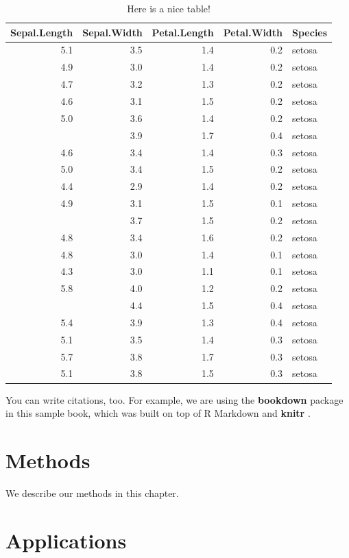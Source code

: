 \documentclass[]{book}
\begin{document}
\begin{table}[t]

\caption{\label{tab:nice-tab}Here is a nice table!}
\centering
\begin{tabular}{rrrrl}
\toprule
Sepal.Length & Sepal.Width & Petal.Length & Petal.Width & Species\\
\midrule
5.1 & 3.5 & 1.4 & 0.2 & setosa\\
4.9 & 3.0 & 1.4 & 0.2 & setosa\\
4.7 & 3.2 & 1.3 & 0.2 & setosa\\
4.6 & 3.1 & 1.5 & 0.2 & setosa\\
5.0 & 3.6 & 1.4 & 0.2 & setosa\\
\addlinespace
5.4 & 3.9 & 1.7 & 0.4 & setosa\\
4.6 & 3.4 & 1.4 & 0.3 & setosa\\
5.0 & 3.4 & 1.5 & 0.2 & setosa\\
4.4 & 2.9 & 1.4 & 0.2 & setosa\\
4.9 & 3.1 & 1.5 & 0.1 & setosa\\
\addlinespace
5.4 & 3.7 & 1.5 & 0.2 & setosa\\
4.8 & 3.4 & 1.6 & 0.2 & setosa\\
4.8 & 3.0 & 1.4 & 0.1 & setosa\\
4.3 & 3.0 & 1.1 & 0.1 & setosa\\
5.8 & 4.0 & 1.2 & 0.2 & setosa\\
\addlinespace
5.7 & 4.4 & 1.5 & 0.4 & setosa\\
5.4 & 3.9 & 1.3 & 0.4 & setosa\\
5.1 & 3.5 & 1.4 & 0.3 & setosa\\
5.7 & 3.8 & 1.7 & 0.3 & setosa\\
5.1 & 3.8 & 1.5 & 0.3 & setosa\\
\bottomrule
\end{tabular}
\end{table}

You can write citations, too. For example, we are using the \textbf{bookdown} package \citep{R-bookdown} in this sample book, which was built on top of R Markdown and \textbf{knitr} \citep{xie2015}.

\hypertarget{methods}{%
\chapter{Methods}\label{methods}}

We describe our methods in this chapter.

\hypertarget{applications}{%
\chapter{Applications}\label{applications}}
\end{document}

